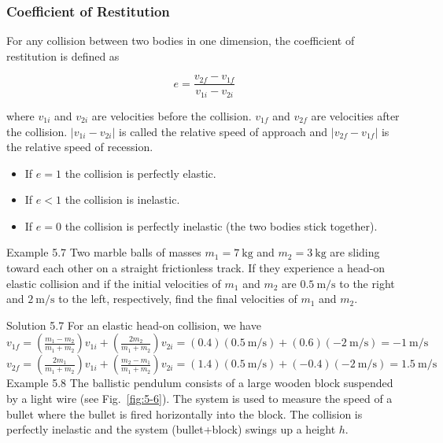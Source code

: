 \documentclass[10pt]{article}
\numberwithin{equation}{section}
\begin{document}
\subsubsection{Coefficient of Restitution}\label{sec:5-4-5}
For any collision between two bodies in one dimension, the coefficient of restitution is defined as

$$
e=\frac{v_{2 f}-v_{1 f}}{v_{1 i}-v_{2 i}}
$$

where $v_{1 i}$ and $v_{2 i}$ are velocities before the collision. $v_{1 f}$ and $v_{2 f}$ are velocities after the collision. $\left|v_{1 i}-v_{2 i}\right|$ is called the relative speed of approach and $\left|v_{2 f}-v_{1 f}\right|$ is the relative speed of recession.

\begin{itemize}
  \item If $e=1$ the collision is perfectly elastic.
  \item If $e<1$ the collision is inelastic.
  \item If $e=0$ the collision is perfectly inelastic (the two bodies stick together).
\end{itemize}

Example 5.7 Two marble balls of masses $m_{1}=7 \mathrm{~kg}$ and $m_{2}=3 \mathrm{~kg}$ are sliding toward each other on a straight frictionless track. If they experience a head-on elastic collision and if the initial velocities of $m_{1}$ and $m_{2}$ are $0.5 \mathrm{~m} / \mathrm{s}$ to the right and $2 \mathrm{~m} / \mathrm{s}$ to the left, respectively, find the final velocities of $m_{1}$ and $m_{2}$.

Solution 5.7 For an elastic head-on collision, we have\\
$v_{1 f}=\left(\frac{m_{1}-m_{2}}{m_{1}+m_{2}}\right) v_{1 i}+\left(\frac{2 m_{2}}{m_{1}+m_{2}}\right) v_{2 i}=(0.4)(0.5 \mathrm{~m} / \mathrm{s})+(0.6)(-2 \mathrm{~m} / \mathrm{s})=-1 \mathrm{~m} / \mathrm{s}$\\
$v_{2 f}=\left(\frac{2 m_{1}}{m_{1}+m_{2}}\right) v_{1 i}+\left(\frac{m_{2}-m_{1}}{m_{1}+m_{2}}\right) v_{2 i}=(1.4)(0.5 \mathrm{~m} / \mathrm{s})+(-0.4)(-2 \mathrm{~m} / \mathrm{s})=1.5 \mathrm{~m} / \mathrm{s}$\\
Example 5.8 The ballistic pendulum consists of a large wooden block suspended by a light wire (see Fig.~\ref{fig:5-6}). The system is used to measure the speed of a bullet where the bullet is fired horizontally into the block. The collision is perfectly inelastic and the system (bullet+block) swings up a height $h$.
\end{document}
